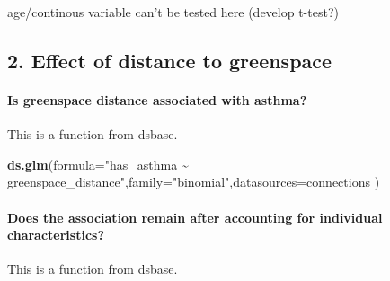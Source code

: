 \documentclass[
]{article}
\newenvironment{Shaded}{\begin{snugshade}}{\end{snugshade}}
\newcommand{\AttributeTok}[1]{\textcolor[rgb]{0.13,0.29,0.53}{#1}}
\newcommand{\ConstantTok}[1]{\textcolor[rgb]{0.56,0.35,0.01}{#1}}
\newcommand{\FunctionTok}[1]{\textcolor[rgb]{0.13,0.29,0.53}{\textbf{#1}}}
\newcommand{\NormalTok}[1]{#1}
\newcommand{\StringTok}[1]{\textcolor[rgb]{0.31,0.60,0.02}{#1}}
\begin{document}
\begin{Shaded}
\end{Shaded}

age/continous variable can't be tested here (develop t-test?)

\subsection{2. Effect of distance to
greenspace}\label{effect-of-distance-to-greenspace}

\paragraph{Is greenspace distance associated with
asthma?}\label{is-greenspace-distance-associated-with-asthma}

This is a function from dsbase.

\begin{Shaded}
\begin{Highlighting}[]
\FunctionTok{ds.glm}\NormalTok{(}\AttributeTok{formula=}\StringTok{"has\_asthma \textasciitilde{} greenspace\_distance"}\NormalTok{,}\AttributeTok{family=}\StringTok{"binomial"}\NormalTok{,}\AttributeTok{datasources=}\NormalTok{connections}
\NormalTok{)}
\end{Highlighting}
\end{Shaded}

\paragraph{Does the association remain after accounting for individual
characteristics?}\label{does-the-association-remain-after-accounting-for-individual-characteristics}

This is a function from dsbase.
\end{document}
